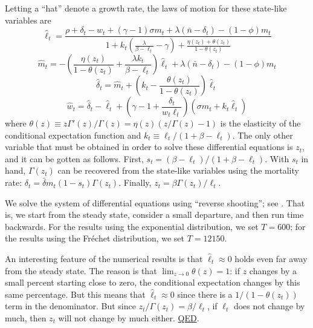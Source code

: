 \documentclass[12pt,twoside]{article}
\begin{document}
Letting a ``hat'' denote a growth rate, the laws of motion for these
state-like variables are
\begin{equation}
\hat{\ell}_t = \frac{\rho+\delta_t-w_t+(\gamma-1)\sigma
  m_t+\lambda(\bar{n}-\delta_t)-(1-\phi)m_t }  %
 {1+k_t
   \left(\frac{\lambda}{\beta-\ell_t}-\gamma \right)  
   +\frac{\eta(z_t)+\theta(z_t)}{1-\theta(z_t)} } %
\end{equation}
\begin{equation}
\hat{m}_t = -\left(\frac{\eta(z_t)}{1-\theta(z_t)}+
  \frac{\lambda k_t}{\beta-\ell_t} \right) \hat{\ell}_t +
  \lambda(\bar{n}-\delta_t)-(1-\phi)m_t
\end{equation}
\begin{equation}
\hat{\delta}_t=\hat{m}_t+ \left( k_t-\frac{\theta(z_t)}{1-\theta(z_t)}
      \right) \hat{\ell}_t
\end{equation}
\begin{equation}
\hat{w}_t = \hat{\delta}_t-\hat{\ell}_t+\left(\gamma-1+\frac{\delta_t}{w_t
  \ell_t} \right) \left( \sigma m_t+k_t \hat{\ell}_t  \right)
\end{equation}
where $\theta(z) \equiv z\Gamma'(z)/\Gamma(z)=\eta(z) (z/\Gamma(z)-1)$
is the elasticity of the conditional expectation function and $k_t
\equiv \ell_t/(1+\beta-\ell_t)$. The only other variable that must be
obtained in order to solve these differential equations is $z_t$, and it
can be gotten as follows. First, $s_t =
(\beta-\ell_t)/(1+\beta-\ell_t)$. With $s_t$ in hand, $\Gamma(z_t)$ can
be recovered from the state-like variables using the mortality rate:
$\delta_t=\bar{\delta} m_t (1-s_t) \Gamma(z_t)$. Finally, $z_t =\beta
\Gamma(z_t)/ \ell_t$.

We solve the system of differential equations using ``reverse
shooting''; see \citet[p. 355]{Judd98}.  That is, we start from the steady
state, consider a small departure, and then run time backwards.  For the
results using the exponential distribution, we set $T=600$; for the
results using the Fr\'{e}chet distribution, we set $T=12150$.

An interesting feature of the numerical results is that $\hat{\ell}_t
\approx 0$ holds even far away from the steady state. The reason is that
$\lim_{z \rightarrow 0} \theta(z)=1$: if $z$ changes by a small percent
starting close to zero, the conditional expectation changes by this same
percentage. But this means that $\hat{\ell}_t \approx 0$ since there is
a $1/(1-\theta(z_t))$ term in the denominator. But since
$z_t/\Gamma(z_t)=\beta/\ell_t$, if $\ell_t$ does not change by much,
then $z_t$ will not change by much either. \hyperlink{APPB}{QED}.

{\small

}
\end{document}
